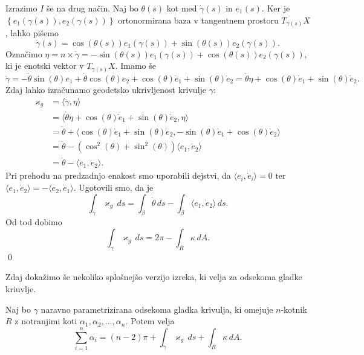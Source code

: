 Izrazimo $I$ še na drug način. Naj bo $\theta(s)$ kot med $\dot{\gamma}(s)$ in $e_1(s)$. Ker je $\left\{ e_1(\gamma(s)), e_2(\gamma(s))\right\}$ ortonormirana baza v tangentnem prostoru
$T_{\gamma(s)}X$, lahko pišemo \begin{equation*}
\dot{\gamma}(s) = \cos(\theta(s))e_1(\gamma(s)) + \sin(\theta(s))e_2(\gamma(s)).
\end{equation*}  
Označimo $\eta = n \times \dot{\gamma} = - \sin(\theta(s)) e_1(\gamma(s)) + \cos(\theta(s)) e_2(\gamma(s))$, ki je enotski vektor v  $T_{\gamma(s)}X$.
Imamo še \begin{equation*}
\ddot{\gamma} = -\dot{\theta} \sin(\theta) e_1 + \dot{\theta} \cos(\theta) e_2 +  \cos(\theta)\dot{e}_1 + \sin(\theta)\dot{e}_2 = \dot{\theta} \eta + \cos(\theta) \dot{e}_1 + \sin(\theta) \dot{e}_2.  
\end{equation*}  
Zdaj lahko izračunamo geodetsko ukrivljenost krivulje $\gamma$: \begin{align*}
    \varkappa_g &= \langle \ddot{\gamma}, \eta \rangle  \\
     &= \langle \dot{\theta} \eta + \cos(\theta) \dot{e}_1 + \sin(\theta) \dot{e}_2, \eta  \rangle \\
     &= \dot{\theta} + \langle \cos(\theta) \dot{e}_1 + \sin(\theta)\dot{e}_2, - \sin(\theta) \dot{e}_1 + \cos(\theta) \dot{e}_2 \rangle \\
     &= \dot{\theta} - (\cos^2(\theta) + \sin^2(\theta) ) \langle e_1, \dot{e}_2  \rangle \\
     &= \dot{\theta} - \langle e_1, \dot{e}_2  \rangle.  
\end{align*}
Pri prehodu na predzadnjo enakost smo uporabili dejstvi, da $\langle e_i, \dot{e}_i \rangle = 0$ ter $\langle e_1, \dot{e}_2 \rangle = - \langle e_2, \dot{e}_1 \rangle$.
Ugotovili smo, da je \begin{equation*}
\int_{\gamma} \varkappa_g  \, ds = \int_{\beta} \dot{\theta}  \, ds - \int_{\beta} \langle e_1, \dot{e}_2 \rangle   \, ds.  
\end{equation*}  
Od tod dobimo \begin{equation*}
    \int_{\gamma} \varkappa_g  \, ds  = 2 \pi  - \int_{R}  \kappa \, dA.  
\end{equation*}  
\qed
  
Zdaj dokažimo še nekoliko splošnejšo verzijo izreka, ki velja za odsekoma gladke kriuvlje.

\begin{izrek}
\label{izr_odsekoma_gladke_krivulje_GB}
Naj bo $\gamma$ naravno parametrizirana odsekoma gladka krivulja, ki omejuje $n$-kotnik $R$ z notranjimi koti $\alpha_1, \alpha_2, \ldots, \alpha_n$. Potem velja \begin{equation*}
\sum_{i=1}^{n} \alpha_i = (n-2) \pi + \int_{\gamma} \varkappa_g  \, ds + \int_{R} \kappa \, dA.  
\end{equation*}  
\end{izrek}

